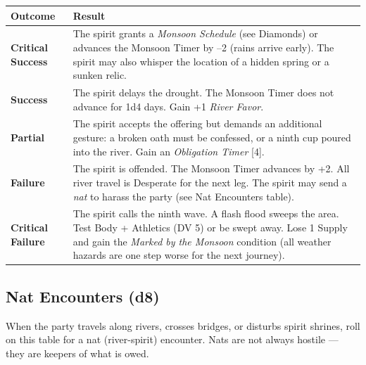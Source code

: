 \begin{longtable}{|p{2cm}|p{10cm}|}
\hline
\rowcolor{gray!20}
\textbf{Outcome} & \textbf{Result} \\
\hline
\textbf{Critical Success} & The spirit grants a \textit{Monsoon Schedule} (see Diamonds) or advances the Monsoon Timer by --2 (rains arrive early). The spirit may also whisper the location of a hidden spring or a sunken relic. \\
\hline
\textbf{Success} & The spirit delays the drought. The Monsoon Timer does not advance for 1d4 days. Gain +1 \textit{River Favor}. \\
\hline
\textbf{Partial} & The spirit accepts the offering but demands an additional gesture: a broken oath must be confessed, or a ninth cup poured into the river. Gain an \textit{Obligation Timer } [4]. \\
\hline
\textbf{Failure} & The spirit is offended. The Monsoon Timer advances by +2. All river travel is Desperate for the next leg. The spirit may send a \textit{nat} to harass the party (see Nat Encounters table). \\
\hline
\textbf{Critical Failure} & The spirit calls the ninth wave. A flash flood sweeps the area. Test Body + Athletics (DV 5) or be swept away. Lose 1 Supply and gain the \textit{Marked by the Monsoon} condition (all weather hazards are one step worse for the next journey). \\
\hline
\end{longtable}

\subsection*{Nat Encounters (d8)}
\label{sec:ayokha-nat-encounters}

When the party travels along rivers, crosses bridges, or disturbs spirit shrines, roll on this table for a nat (river-spirit) encounter. Nats are not always hostile --- they are keepers of what is owed.

